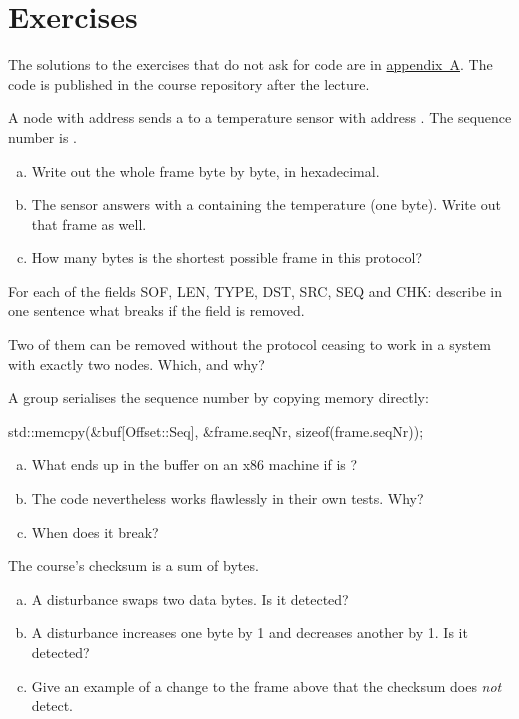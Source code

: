 \section*{Exercises}

The solutions to the exercises that do not ask for code are in
\hyperref[ch:losningar]{appendix~A}. The code is published in the course repository after the
lecture.

\label{ex:1:1}
A node with address  sends a  to a temperature sensor with address
. The sequence number is .
\begin{enumerate}[a)]
  \item Write out the whole frame byte by byte, in hexadecimal.
  \item The sensor answers with a  containing the temperature 
    (one byte). Write out that frame as well.
  \item How many bytes is the shortest possible frame in this protocol?
\end{enumerate}

\label{ex:1:2}
For each of the fields SOF, LEN, TYPE, DST, SRC, SEQ and CHK: describe in one sentence what
breaks if the field is removed.

Two of them can be removed without the protocol ceasing to work in a system with exactly two
nodes. Which, and why?

\label{ex:1:3}
A group serialises the sequence number by copying memory directly:

\begin{cppcode}
std::memcpy(&buf[Offset::Seq], &frame.seqNr, sizeof(frame.seqNr));
\end{cppcode}

\begin{enumerate}[a)]
  \item What ends up in the buffer on an x86 machine if  is ?
  \item The code nevertheless works flawlessly in their own tests. Why?
  \item When does it break?
\end{enumerate}

\label{ex:1:4}
The course's checksum is a sum of bytes.
\begin{enumerate}[a)]
  \item A disturbance swaps two data bytes. Is it detected?
  \item A disturbance increases one byte by 1 and decreases another by 1. Is it detected?
  \item Give an example of a change to the frame above that the checksum does \emph{not} detect.
\end{enumerate}
